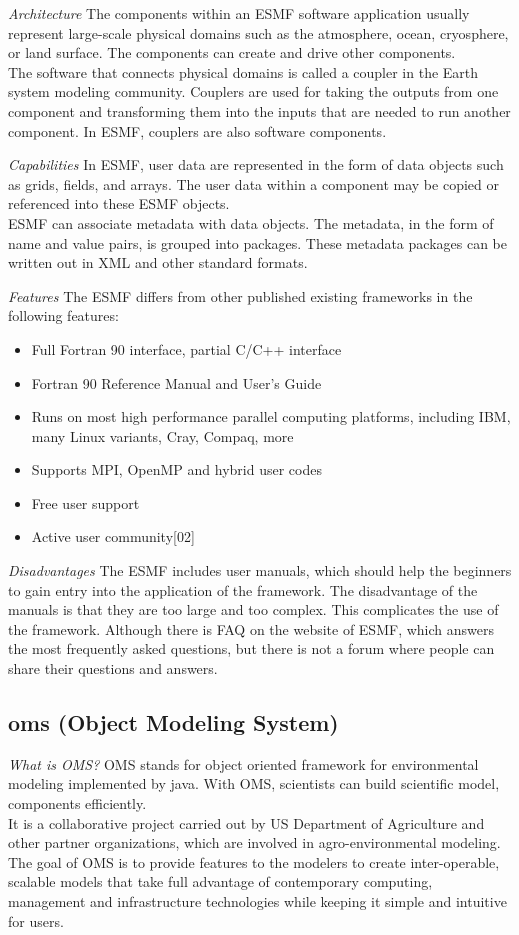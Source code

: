 \emph{Architecture}
The components within an ESMF software application usually represent large-scale physical domains such as the atmosphere, ocean, cryosphere, or land surface. The components can create and drive other components.\\
The software that connects physical domains is called a coupler in the Earth system modeling community. Couplers are used for taking the outputs from one component and transforming them into the inputs that are needed to run another component. In ESMF, couplers are also software components.

\emph{Capabilities}
In ESMF, user data are represented in the form of data objects such as grids, fields, and arrays. The user data within a component may be copied or referenced into these ESMF objects.\\
ESMF can associate metadata with data objects. The metadata, in the form of name and value pairs, is grouped into packages. These metadata packages can be written out in XML and other standard formats.

\emph{Features}
The ESMF differs from other published existing frameworks in the following features:
\begin{itemize}
	\item Full Fortran 90 interface, partial C/C++ interface
	\item Fortran 90 Reference Manual and User's Guide
	\item Runs on most high performance parallel computing platforms, including IBM, many Linux variants, Cray, Compaq, more
	\item Supports MPI, OpenMP and hybrid user codes
	\item Free user support
	\item Active user community[02]
\end{itemize}

\emph{Disadvantages}
The ESMF includes user manuals, which should help the beginners to gain entry into the application of the framework. The disadvantage of the manuals is that they are too large and too complex. This complicates the use of the framework.
Although there is FAQ on the website of ESMF, which answers the most frequently asked questions, but there is not a forum where people can share their questions and answers.

\subsection{oms (Object Modeling System)}
\emph{What is OMS?}
OMS stands for object oriented framework for environmental modeling implemented by java. With OMS, scientists can build scientific model, components efficiently.\\
It is a collaborative project carried out by US Department of Agriculture and other partner organizations, which are involved in agro-environmental modeling. The goal of OMS is to provide features to the modelers to create inter-operable, scalable models that take full advantage of contemporary computing, management and infrastructure technologies while keeping it simple and intuitive for users.

